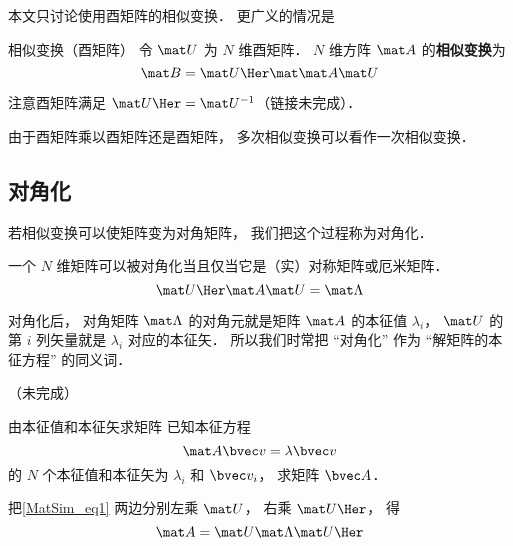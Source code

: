 
本文只讨论使用酉矩阵的相似变换． 更广义的情况是

\begin{definition}{相似变换（酉矩阵）}
令 $\mat U$ 为 $N$ 维酉矩阵． $N$ 维方阵 $\mat A$ 的\textbf{相似变换}为
\begin{equation}
\mat B = \mat U\Her \mat \mat A \mat U
\end{equation}
\end{definition}

注意酉矩阵满足 $\mat U\Her = \mat U^{-1}$（链接未完成）．

由于酉矩阵乘以酉矩阵还是酉矩阵， 多次相似变换可以看作一次相似变换．

\subsection{对角化}
若相似变换可以使矩阵变为对角矩阵， 我们把这个过程称为对角化．

一个 $N$ 维矩阵可以被对角化当且仅当它是（实）对称矩阵或厄米矩阵．
\begin{equation}\label{MatSim_eq1}
\mat U\Her \mat A \mat U = \mat \Lambda
\end{equation}

对角化后， 对角矩阵 $\mat \Lambda$ 的对角元就是矩阵 $\mat A$ 的本征值 $\lambda_i$， $\mat U$ 的第 $i$ 列矢量就是 $\lambda_i$ 对应的本征矢． 所以我们时常把 “对角化” 作为 “解矩阵的本征方程” 的同义词．

（未完成）

\begin{example}{由本征值和本征矢求矩阵}
已知本征方程
\begin{equation}
\mat A \bvec v = \lambda \bvec v
\end{equation}
的 $N$ 个本征值和本征矢为 $\lambda_i$ 和 $\bvec v_i$， 求矩阵 $\bvec A$．

把\autoref{MatSim_eq1} 两边分别左乘 $\mat U$， 右乘 $\mat U\Her$， 得
\begin{equation}
\mat A = \mat U \mat \Lambda \mat U\Her
\end{equation}
\end{example}
